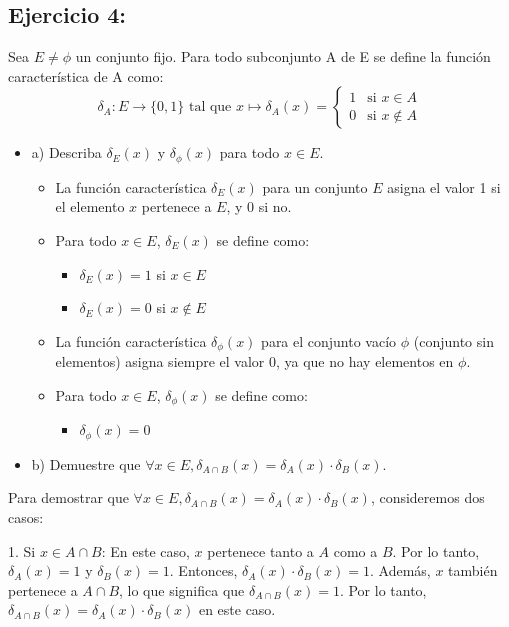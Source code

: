 \documentclass{templateNote}
\begin{document}
\subsection*{\textbf{Ejercicio 4:}}
Sea $E \neq \phi$ un conjunto fijo. Para todo subconjunto A de E se define la función
característica de A como:
\[\delta_A : E \rightarrow \{0,1\}\text{ tal que } x \mapsto \delta_A (x)=\begin{cases} 1 & \text{si } x \in A \\ 0 & \text{si } x \notin A \end{cases}\]

\begin{itemize}
    \item a) Describa $\delta_E(x)$ y $\delta_{\phi}(x)$ para todo $x \in E$.
    \begin{itemize}
        \item La función característica $\delta_E(x)$ para un conjunto $E$ asigna el valor 1 si el elemento $x$ pertenece a $E$, y 0 si no.
        \item Para todo $x \in E$, $\delta_E(x)$ se define como:
        \begin{itemize}
            \item $\delta_E(x) = 1$ si $x \in E$
            \item $\delta_E(x) = 0$ si $x \notin E$ 
        \end{itemize}
        \item La función característica $\delta_{\phi}(x)$ para el conjunto vacío $\phi$ (conjunto sin elementos) asigna siempre el valor 0, ya que no hay elementos en $\phi$.
        \item Para todo $x \in E$, $\delta_{\phi}(x)$ se define como:
        \begin{itemize}
            \item $\delta_{\phi}(x) = 0$
        \end{itemize}
    \end{itemize}
\end{itemize}

\begin{itemize}
    \item b) Demuestre que $\forall x \in E, \delta_{A\cap B}(x) = \delta_A(x)\cdot \delta_B(x)$.
\end{itemize}
Para demostrar que 
\(\forall x \in E, \delta_{A\cap B}(x) = \delta_A(x)\cdot \delta_B(x)\), consideremos dos casos:

1. Si \(x \in A \cap B\): En este caso, \(x\) pertenece tanto a \(A\) como a \(B\). Por lo tanto, \(\delta_A(x) = 1\) y \(\delta_B(x) = 1\). Entonces, \(\delta_A(x) \cdot \delta_B(x) = 1\). Además, \(x\) también pertenece a \(A \cap B\), lo que significa que \(\delta_{A \cap B}(x) = 1\). Por lo tanto, \(\delta_{A \cap B}(x) = \delta_A(x) \cdot \delta_B(x)\) en este caso.
\end{document}

